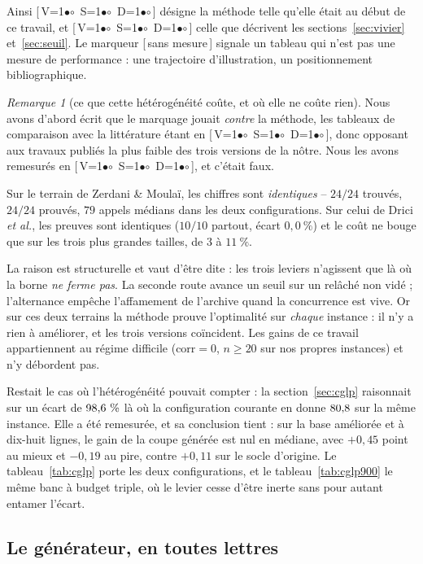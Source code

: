\documentclass[11pt,a4paper]{article}
\theoremstyle{plain}
\theoremstyle{remark}
\newtheorem{remark}{Remarque}
\newcommand{\cfgm}[1]{\ifnum#1=1$\bullet$\else$\circ$\fi}
\newcommand{\conf}[3]{%
  \textsf{\footnotesize[\,V\cfgm{#1}\ S\cfgm{#2}\ D\cfgm{#3}\,]}}
\newcommand{\confna}{\textsf{\footnotesize[\,sans mesure\,]}}
\begin{document}
\noindent
Ainsi \conf{0}{0}{0} désigne la méthode telle qu'elle était au début de ce
travail, et \conf{1}{1}{1} celle que décrivent les sections~\ref{sec:vivier}
et~\ref{sec:seuil}. Le marqueur \confna{} signale un tableau qui n'est pas
une mesure de performance : une trajectoire d'illustration, un
positionnement bibliographique.

\begin{remark}[ce que cette hétérogénéité coûte, et où elle ne coûte rien]
Nous avons d'abord écrit que le marquage jouait \emph{contre} la méthode,
les tableaux de comparaison avec la littérature étant en \conf{0}{0}{0},
donc opposant aux travaux publiés la plus faible des trois versions de la
nôtre. Nous les avons remesurés en \conf{1}{1}{1}, et c'était faux.

Sur le terrain de Zerdani \& Moulaï, les chiffres sont \emph{identiques} --
$24/24$ trouvés, $24/24$ prouvés, $79$ appels médians dans les deux
configurations. Sur celui de Drici \emph{et al.}, les preuves sont
identiques ($10/10$ partout, écart $0{,}0\ \%$) et le coût ne bouge que sur
les trois plus grandes tailles, de $3$ à $11\ \%$.

La raison est structurelle et vaut d'être dite : les trois leviers
n'agissent que là où la borne \emph{ne ferme pas}. La seconde route avance
un seuil sur un relâché non vidé ; l'alternance empêche l'affamement de
l'archive quand la concurrence est vive. Or sur ces deux terrains la
méthode prouve l'optimalité sur \emph{chaque} instance : il n'y a rien à
améliorer, et les trois versions coïncident. Les gains de ce travail
appartiennent au régime difficile ($\text{corr}=0$, $n\ge 20$ sur nos
propres instances) et n'y débordent pas.

Restait le cas où l'hétérogénéité pouvait compter : la
section~\ref{sec:cglp} raisonnait sur un écart de $98{,}6{}\ \%$ là où la
configuration courante en donne $80{,}8{}$ sur la même instance. Elle a été
remesurée, et sa conclusion tient : sur la base améliorée et à
dix-huit lignes, le gain de la coupe générée est nul en médiane, avec
$+0{,}45$ point au mieux et $-0{,}19$ au pire, contre $+0{,}11$ sur le socle
d'origine. Le tableau~\ref{tab:cglp} porte les deux configurations, et le
tableau~\ref{tab:cglp900} le même banc à budget triple, où le levier cesse
d'être inerte sans pour autant entamer l'écart.
\end{remark}

\subsection{Le générateur, en toutes lettres}
\label{sec:generateur}
\end{document}
